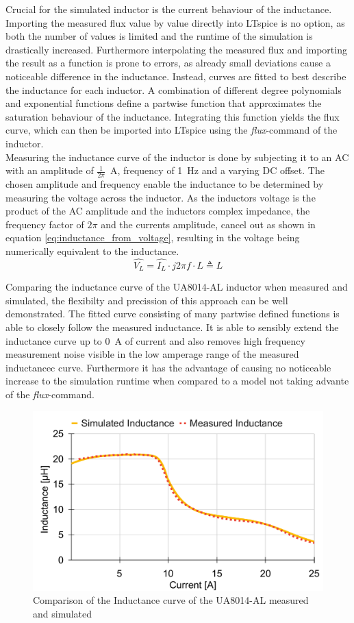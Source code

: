 Crucial for the simulated inductor is the current behaviour of the inductance. Importing the measured flux value by value directly into LTspice is no option, as both the number of values is limited and the runtime of the simulation is drastically increased. Furthermore interpolating the measured flux and importing the result as a function is prone to errors, as already small deviations cause a noticeable difference in the inductance. Instead, curves are fitted to best describe the inductance for each inductor. A combination of different degree polynomials and exponential functions define a partwise function that approximates the saturation behaviour of the inductance. Integrating this function yields the flux curve, which can then be imported into LTspice using the \textit{flux}-command of the inductor.\\
Measuring the inductance curve of the inductor is done by subjecting it to an \ac{AC} with an amplitude of $\frac{1}{2\pi}$\SI{ }{\A}, frequency of \SI{1}{\Hz} and a varying \ac{DC} offset. The chosen amplitude and frequency enable the inductance to be determined by measuring the voltage across the inductor. As the inductors voltage is the product of the \ac{AC} amplitude and the inductors complex impedance, the frequency factor of $2\pi$ and the currents amplitude, cancel out as shown in equation \ref{eq:inductance_from_voltage}, resulting in the voltage being numerically equivalent to the inductance.
\begin{equation}\label{eq:inductance_from_voltage}
    \hat{V_L} = \hat{I_L} \cdot j 2\pi f\cdot L \triangleq L
\end{equation}

Comparing the inductance curve of the UA8014-AL inductor when measured and simulated, the flexibilty and precission of this approach can be well demonstrated. The fitted curve consisting of many partwise defined functions is able to closely follow the measured inductance. It is able to sensibly extend the inductance curve up to \SI{0}{\A} of current and also removes high frequency measurement noise visible in the low amperage range of the measured inductancec curve. Furthermore it has the advantage of causing no noticeable increase to the simulation runtime when compared to a model not taking advante of the \textit{flux}-command. 
\begin{figure}[H]
    \centering
    \includegraphics[width=0.6\linewidth]{Bilder/Kapitel3/Saturation_Measured_vs_LTspice.pdf}
    \caption{Comparison of the Inductance curve of the UA8014-AL measured and simulated}
    \label{fig:comparison_of_saturation}
\end{figure}

